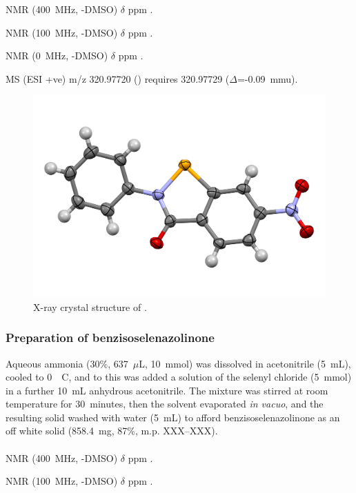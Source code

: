 {\footnotesize
{} NMR (400~MHz, -DMSO) $\delta$ ppm
.

 NMR (100~MHz, -DMSO) $\delta$ ppm
.

 NMR (0~MHz, -DMSO) $\delta$ ppm
.

MS (ESI +ve) m/z 320.97720 ()  requires 320.97729 ($\Delta$=-0.09~mmu).
}

\begin{figure}[h]
    \centering
    \includegraphics[width=0.8\linewidth]{Figures/ebs-3no2-xray.png}
    \caption{X-ray crystal structure of .}
    \label{fig:ebs-3no2-xray}
\end{figure}

\subsubsection{Preparation of benzisoselenazolinone }
Aqueous ammonia (30\%, 637~$\mu$L, 10~mmol) was dissolved in acetonitrile (5~mL), cooled to 0~\degree~C, and to this was added a solution of the selenyl chloride  (5~mmol) in a further 10~mL anhydrous acetonitrile.
The mixture was stirred at room temperature for 30~minutes, then the solvent evaporated \emph{in vacuo}, and the resulting solid washed with water (5~mL) to afford benzisoselenazolinone  as an off white solid (858.4~mg, 87\%, m.p. XXX--XXX).

\footnotesize\paragraph{}

 NMR (400~MHz, -DMSO) $\delta$ ppm
.

 NMR (100~MHz, -DMSO) $\delta$ ppm
.

